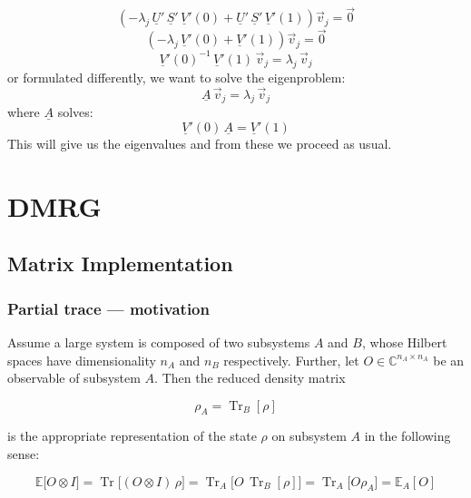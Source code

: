 \begin{equation*}
    \left( -\lambda_j\, \underline{U}'\,\underline{S}'\,\underline{V}'(0) + \underline{U}'\,\underline{S}'\,\underline{V}'(1) \right) \vec{v}_j = \vec{0}
\end{equation*}
\begin{equation*}
    \left( -\lambda_j\, \underline{V}'(0) + \underline{V}'(1) \right) \vec{v}_j = \vec{0}
\end{equation*}
\begin{equation*}
    \underline{V}'(0)^{-1}\, \underline{V}'(1)\, \vec{v}_j = \lambda_j\, \vec{v}_j
\end{equation*}
or formulated differently, we want to solve the eigenproblem:
\begin{equation*}
    \underline{A}\, \vec{v}_j = \lambda_j\, \vec{v}_j
\end{equation*}
where $\underline{A}$ solves:
\begin{equation*}
    \underline{V}'(0)\, \underline{A} = \underline{V}'(1)
\end{equation*}
This will give us the eigenvalues and from these we proceed as usual.




\section{DMRG}

\subsection{Matrix Implementation}

\subsubsection{Partial trace --- motivation}

Assume a large system is composed of two subsystems $A$ and $B$, whose
Hilbert spaces have dimensionality $n_A$ and $n_B$ respectively. Further, let
$O\in\mathbb C^{n_A\times n_A}$ be an observable of subsystem $A$. Then
the reduced density matrix

\begin{equation}
\rho_A = \operatorname{Tr}_B[\rho]
\end{equation}

is the appropriate representation of the state $\rho$ on subsystem $A$
in the following sense:

\begin{equation}
\mathbb E\big[O\otimes I\big] = \operatorname{Tr}\big[(O\otimes I)\,\rho\big]
= \operatorname{Tr}_A\big[O\,\operatorname{Tr}_B[\rho]\big] = \operatorname{Tr}_A\big[O\rho_A\big] = \mathbb E_A[O]
\end{equation}

